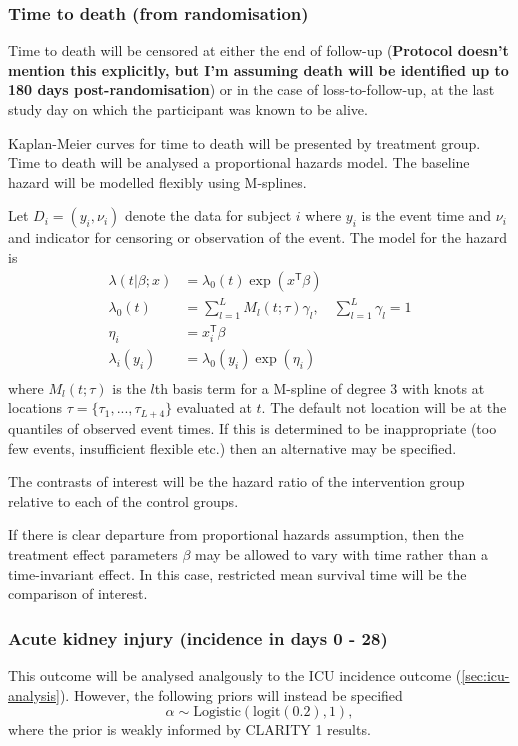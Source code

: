\documentclass[11pt,parskip=half-]{scrartcl}
\begin{document}
\subsubsection{Time to death (from randomisation)}
Time to death will be censored at either the end of follow-up (\textbf{Protocol doesn't mention this explicitly, but I'm assuming death will be identified up to 180 days post-randomisation}) or in the case of loss-to-follow-up, at the last study day on which the participant was known to be alive.

Kaplan-Meier curves for time to death will be presented by treatment group. Time to death will be analysed a proportional hazards model. The baseline hazard will be modelled flexibly using M-splines.

Let $D_i = (y_i, \nu_i)$ denote the data for subject $i$ where $y_i$ is the event time and $\nu_i$ and indicator for censoring or observation of the event. The model for the hazard is
$$
    \begin{aligned}
        \lambda(t|\beta;x) & = \lambda_0(t)\exp(x^\mathsf{T}\beta)                           \\
        \lambda_0(t)       & = \sum_{l=1}^L M_l(t;\tau)\gamma_l,\quad \sum_{l=1}^L\gamma_l=1 \\
        \eta_i             & = x_i^\mathsf{T}\beta                                           \\
        \lambda_i(y_i)     & = \lambda_0(y_i)\exp(\eta_i)                                    \\
    \end{aligned}
$$
where $M_l(t;\tau)$ is the $l$th basis term for a M-spline of degree 3 with knots at locations $\tau=\{\tau_1,...,\tau_{L+4}\}$ evaluated at $t$. The default not location will be at the quantiles of observed event times. If this is determined to be inappropriate (too few events, insufficient flexible etc.) then an alternative may be specified.

The contrasts of interest will be the hazard ratio of the intervention group relative to each of the control groups.

If there is clear departure from proportional hazards assumption, then the treatment effect parameters $\beta$ may be allowed to vary with time rather than a time-invariant effect. In this case, restricted mean survival time will be the comparison of interest.

\subsubsection{Acute kidney injury (incidence in days 0 - 28)}
This outcome will be analysed analgously to the ICU incidence outcome (\ref{sec:icu-analysis}). However, the following priors will instead be specified
$$
    \alpha \sim \text{Logistic}(\text{logit}(0.2), 1),
$$
where the prior is weakly informed by CLARITY 1 results.
\end{document}

